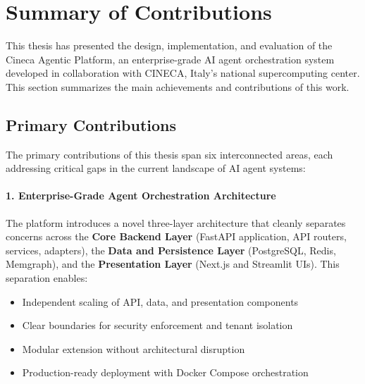 
\section{Summary of Contributions}
\label{sec:summary}

This thesis has presented the design, implementation, and evaluation of the Cineca Agentic Platform, an enterprise-grade AI agent orchestration system developed in collaboration with CINECA, Italy's national supercomputing center. This section summarizes the main achievements and contributions of this work.

\subsection{Primary Contributions}

The primary contributions of this thesis span six interconnected areas, each addressing critical gaps in the current landscape of AI agent systems:

\paragraph{1. Enterprise-Grade Agent Orchestration Architecture}

The platform introduces a novel three-layer architecture that cleanly separates concerns across the \textbf{Core Backend Layer} (FastAPI application, API routers, services, adapters), the \textbf{Data and Persistence Layer} (PostgreSQL, Redis, Memgraph), and the \textbf{Presentation Layer} (Next.js and Streamlit UIs). This separation enables:

\begin{itemize}
    \item Independent scaling of API, data, and presentation components
    \item Clear boundaries for security enforcement and tenant isolation
    \item Modular extension without architectural disruption
    \item Production-ready deployment with Docker Compose orchestration
\end{itemize}

